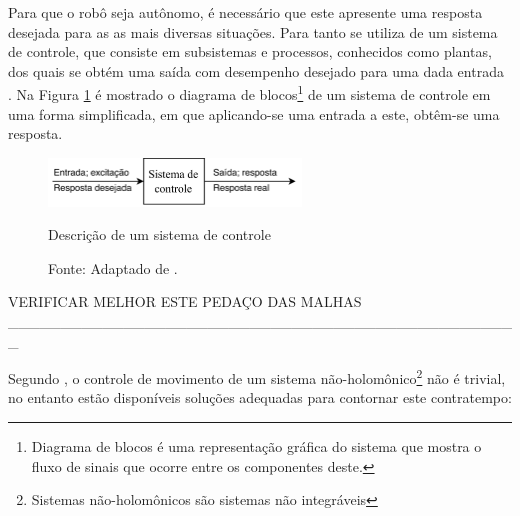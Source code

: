 Para que o robô seja autônomo, %
é necessário que este apresente uma resposta desejada para as 
as mais diversas situações. 
Para tanto se utiliza de um sistema de controle, que consiste em subsistemas e processos, conhecidos como plantas, 
dos quais se obtém uma saída com desempenho desejado para uma dada entrada \cite{nise}. Na Figura 
\ref{fig:basicdiag} é mostrado o diagrama de blocos\footnote{Diagrama de blocos é uma representação gráfica do sistema que mostra o 
fluxo de sinais que ocorre entre os componentes deste.} de 
um sistema de controle em uma forma simplificada, em que aplicando-se uma entrada a este, obtêm-se uma 
resposta.

\begin{figure}[h]
 \centering
 \captionsetup{width=0.6\textwidth,font=footnotesize,textfont=bf}
 \includegraphics[width=0.6\textwidth]{figuras/DiagramaNise.png}
 \caption{Descrição de um sistema de controle \label{fig:basicdiag}}
  \vspace{-0.3cm}
 \caption*{Fonte: Adaptado de \cite[p.2]{nise}.}
\end{figure}

VERIFICAR MELHOR ESTE PEDAÇO DAS MALHAS
_________________________________________________

Segundo , o controle de movimento de 
um sistema não-holomônico\footnote{Sistemas não-holomônicos são sistemas não integráveis} não é trivial, no entanto estão disponíveis 
soluções adequadas para contornar este contratempo:

